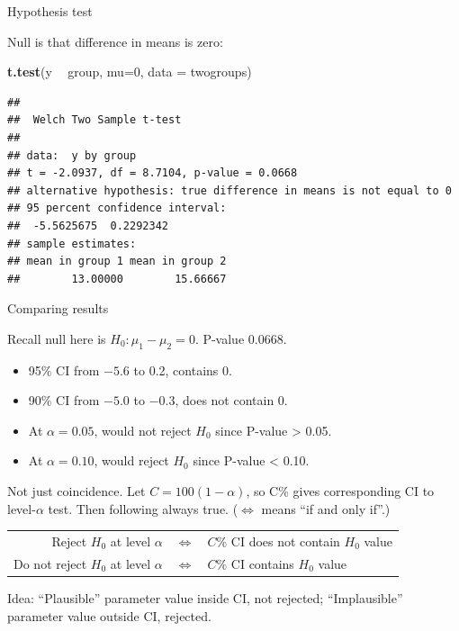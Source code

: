 \documentclass[ignorenonframetext,]{beamer}
\newenvironment{Shaded}{\begin{snugshade}}{\end{snugshade}}
\newcommand{\DataTypeTok}[1]{\textcolor[rgb]{0.13,0.29,0.53}{#1}}
\newcommand{\DecValTok}[1]{\textcolor[rgb]{0.00,0.00,0.81}{#1}}
\newcommand{\KeywordTok}[1]{\textcolor[rgb]{0.13,0.29,0.53}{\textbf{#1}}}
\newcommand{\NormalTok}[1]{#1}
\newcommand{\OperatorTok}[1]{\textcolor[rgb]{0.81,0.36,0.00}{\textbf{#1}}}
\newcommand{\StringTok}[1]{\textcolor[rgb]{0.31,0.60,0.02}{#1}}
\providecommand{\tightlist}{%
  \setlength{\itemsep}{0pt}\setlength{\parskip}{0pt}}
\begin{document}
\begin{frame}[fragile]{Hypothesis test}
\protect\hypertarget{hypothesis-test-1}{}

Null is that difference in means is zero:

\begin{Shaded}
\begin{Highlighting}[]
\KeywordTok{t.test}\NormalTok{(y }\OperatorTok{~}\StringTok{ }\NormalTok{group, }\DataTypeTok{mu=}\DecValTok{0}\NormalTok{, }\DataTypeTok{data =}\NormalTok{ twogroups)}
\end{Highlighting}
\end{Shaded}

\begin{verbatim}
## 
##  Welch Two Sample t-test
## 
## data:  y by group
## t = -2.0937, df = 8.7104, p-value = 0.0668
## alternative hypothesis: true difference in means is not equal to 0
## 95 percent confidence interval:
##  -5.5625675  0.2292342
## sample estimates:
## mean in group 1 mean in group 2 
##        13.00000        15.66667
\end{verbatim}

\end{frame}

\begin{frame}{Comparing results}
\protect\hypertarget{comparing-results}{}

Recall null here is \(H_0 : \mu_1 - \mu_2 = 0\). P-value 0.0668.

\begin{itemize}
\tightlist
\item
  95\% CI from \(-5.6\) to 0.2, contains 0.
\item
  90\% CI from \(-5.0\) to \(-0.3\), does not contain 0.
\item
  At \(\alpha = 0.05\), would not reject \(H_0\) since P-value
  \textgreater{} 0.05.
\item
  At \(\alpha = 0.10\), would reject \(H_0\) since P-value \textless{}
  0.10.
\end{itemize}

Not just coincidence. Let \(C = 100(1 - \alpha)\), so C\% gives
corresponding CI to level-\(\alpha\) test. Then following always true.
(\(\iff\) means ``if and only if''.)

\begin{tabular}{|rcl|}
  \hline
  Reject $H_0$ at level $\alpha$ & $\iff$ & $C\%$ CI does not contain $H_0$ value\\
  Do not reject $H_0$ at level $\alpha$ & $\iff$ & $C\%$ CI contains $H_0$ value\\
  \hline
\end{tabular}

Idea: ``Plausible'' parameter value inside CI, not rejected;
``Implausible'' parameter value outside CI, rejected.

\end{frame}
\end{document}
